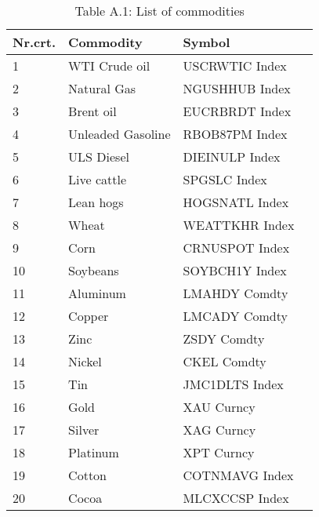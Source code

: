 \begin{table}[H]
	\begin{minipage}[b]{0.48\textwidth}
		\centering
		\tiny{	\caption*{Table A.1: List of commodities}
			\begin{tabular}{llll} \hline\hline
				Nr.crt. & Commodity & Symbol   \\ \hline
				1 & WTI Crude oil & USCRWTIC Index   \\
				2 & Natural Gas & NGUSHHUB Index   \\
				3 & Brent oil & EUCRBRDT Index  \\
				4 & Unleaded Gasoline & RBOB87PM Index   \\
				5 & ULS Diesel & DIEINULP Index  \\
				6 & Live cattle & SPGSLC Index   \\
				7 & Lean hogs & HOGSNATL Index   \\
				8 & Wheat & WEATTKHR Index   \\
				9 & Corn & CRNUSPOT Index   \\
				10 & Soybeans & SOYBCH1Y Index   \\
				11 & Aluminum & LMAHDY Comdty   \\
				12 & Copper & LMCADY Comdty   \\
				13 & Zinc & ZSDY Comdty   \\
				14 & Nickel & CKEL Comdty   \\
				15 & Tin & JMC1DLTS Index   \\
				16 & Gold & XAU Curncy   \\
				17 & Silver & XAG Curncy   \\
				18 & Platinum & XPT Curncy   \\
				19 & Cotton & COTNMAVG Index   \\
				20 & Cocoa & MLCXCCSP Index \\ \hline\hline
		\end{tabular}}
	

\end{minipage}
\end{table}
